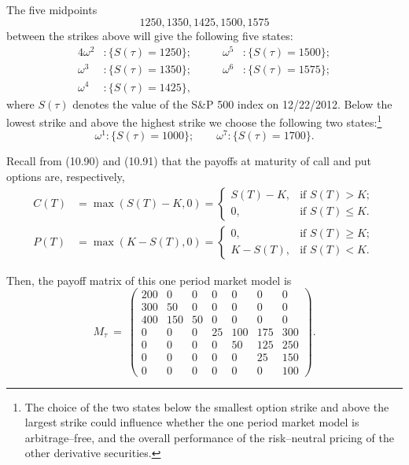 The five midpoints
\[
1250, 1350, 1425, 1500, 1575
\]
between the strikes above will give the following five states:
\begin{alignat*}{4}
\omega^2 &: \{S(\tau) = 1250\}; &\qquad \omega^5 &: \{S(\tau) = 1500\}; \\
\omega^3 &: \{S(\tau) = 1350\}; &\qquad \omega^6 &: \{S(\tau) = 1575\}; \\
\omega^4 &: \{S(\tau) = 1425\}, & &
\end{alignat*}
where $S(\tau)$ denotes the value of the S\&P 500 index on 12/22/2012.
Below the lowest strike and above the highest strike we choose the
following two states:\footnote{The choice of the two states below the
smallest option strike and above the largest strike could influence
whether the one period market model is arbitrage--free, and the overall
performance of the risk--neutral pricing of the other derivative
securities.}
\[
\omega^1 : \{S(\tau) = 1000\}; \qquad \omega^7 : \{S(\tau) = 1700\}.
\]

Recall from (10.90) and (10.91) that the payoffs at maturity of call and
put options are, respectively,
\begin{align}
C(T) &= \max(S(T)-K,0) = \begin{cases} S(T)-K, & \text{if } S(T) > K; \\ 0, & \text{if } S(T) \le K. \end{cases} \\
P(T) &= \max(K-S(T),0) = \begin{cases} 0, & \text{if } S(T) \ge K; \\ K-S(T), & \text{if } S(T) < K. \end{cases}
\end{align}

Then, the payoff matrix of this one period market model is
\begin{equation}
M_\tau \ = \
\begin{pmatrix}
200 & 0   & 0  & 0  & 0   & 0   & 0   \\
300 & 50  & 0  & 0  & 0   & 0   & 0   \\
400 & 150 & 50 & 0  & 0   & 0   & 0   \\
0   & 0   & 0  & 25 & 100 & 175 & 300 \\
0   & 0   & 0  & 0  & 50  & 125 & 250 \\
0   & 0   & 0  & 0  & 0   & 25  & 150 \\
0   & 0   & 0  & 0  & 0   & 0   & 100
\end{pmatrix}.
\end{equation}

